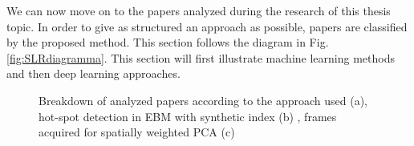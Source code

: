 We can now move on to the papers analyzed during the research of this thesis topic. In order to give as structured an approach as possible, papers are classified by the proposed method. This section follows the diagram in Fig. \ref{fig:SLRdiagramma}. This section will first illustrate machine learning methods and then deep learning approaches.
\begin{figure}
    \centering
    \qquad
    \qquad
    \caption[Hot spots detection.]{Breakdown of analyzed papers according to the approach used (a), hot-spot detection in EBM with synthetic index (b) \cite{grasso_powder_2020}, frames acquired for spatially weighted PCA (c) \cite{colosimo_spatially_2018}}
\end{figure}

